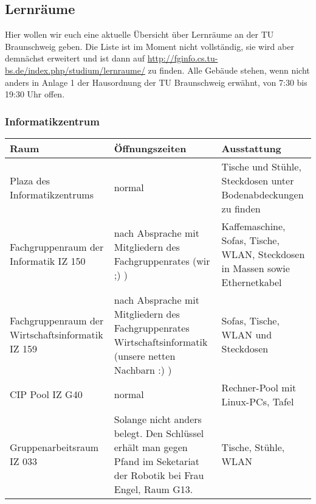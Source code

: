 \subsection{Lernräume}
	Hier wollen wir euch eine aktuelle Übersicht über Lernräume an der TU Braunschweig geben. Die Liste ist im Moment nicht vollständig, sie wird aber demnächst erweitert und ist dann auf \url{http://fginfo.cs.tu-bs.de/index.php/studium/lernraume/} zu finden. Alle Gebäude stehen, wenn nicht anders in Anlage 1 der Hausordnung der TU Braunschweig erwähnt, von 7:30 bis 19:30 Uhr offen.
	\subsubsection*{Informatikzentrum}
		\begin{tabular}{|p{4cm}|p{5cm}|p{8cm}|}
			\hline Raum & Öffnungszeiten & Ausstattung \\ 
			\hline Plaza des Informatikzentrums & normal &  Tische und Stühle, Steckdosen unter Bodenabdeckungen zu finden \\
			\hline Fachgruppenraum der Informatik IZ 150 &
			nach Absprache mit Mitgliedern des
			Fachgruppenrates (wir ;) ) & Kaffemaschine,
			Sofas, Tische, WLAN, Steckdosen in Massen sowie Ethernetkabel\\ 
			\hline Fachgruppenraum der Wirtschaftsinformatik
			IZ 159 & nach Absprache mit Mitgliedern des
			Fachgruppenrates Wirtschaftsinformatik (unsere
			netten Nachbarn :) )& Sofas, Tische, WLAN und Steckdosen \\ 
			\hline CIP Pool IZ G40 & normal & Rechner-Pool mit Linux-PCs, Tafel\\ 
			\hline Gruppenarbeitsraum IZ 033 & 
			
			Solange nicht anders belegt. Den Schlüssel
			erhält man gegen Pfand im Seketariat der Robotik bei Frau Engel,
			Raum G13.
			 &
			Tische, Stühle, WLAN
			\\
			\hline
		\end{tabular}
